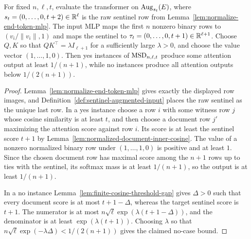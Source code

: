 \begin{lemma}
  \label{lem:msd-normalized-attention-gap}
  For fixed $n,\ell,t$, evaluate the transformer on
  $\operatorname{Aug}_{s_t}(E)$, where $s_t=(0,\ldots,0,t+2)\in\mathbb{R}^\ell$ is the raw sentinel
  row from Lemma~\ref{lem:normalize-end-token-mlp}.  The input MLP maps the
  first $n$ nonzero binary rows to $(v_i/\|v_i\|,1)$ and maps the sentinel to
  $\tau_t=(0,\ldots,0,t+1)\in\mathbb{R}^{\ell+1}$.  Choose $Q,K$ so that
  $QK^\top=\lambda I_{\ell+1}$ for a sufficiently large $\lambda>0$, and choose
  the value vector $(1,\ldots,1,0)$.  Then yes instances of
  $\mathrm{MSD}_{n,\ell,t}$ produce some attention output at least $1/(n+1)$, while no
  instances produce all attention outputs below $1/(2(n+1))$.
\end{lemma}
\begin{proof}
  Lemma~\ref{lem:normalize-end-token-mlp} gives exactly the displayed row
  images, and Definition~\ref{def:sentinel-augmented-input} places the raw
  sentinel as the unique last row.  In a yes instance choose a row $i$ with
  some witness row $j$ whose cosine similarity is at least $t$, and then choose
  a document row $j'$ maximizing the attention score against row $i$.  Its
  score is at least the sentinel score $t+1$ by
  Lemma~\ref{lem:normalized-document-inner-cosine}.  The value of a nonzero
  normalized binary row under $(1,\ldots,1,0)$ is positive and at least $1$.
  Since the chosen document row has maximal score among the $n+1$ rows up to
  ties with the sentinel, its softmax mass is at least $1/(n+1)$, so the output
  is at least $1/(n+1)$.

  In a no instance Lemma~\ref{lem:finite-cosine-threshold-gap} gives
  $\Delta>0$ such that every document score is at most $t+1-\Delta$, whereas
  the target sentinel score is $t+1$.  The numerator is at most
  $n\sqrt{\ell}\exp(\lambda(t+1-\Delta))$, and the denominator is at least
  $\exp(\lambda(t+1))$.  Choosing $\lambda$ so that
  $n\sqrt{\ell}\exp(-\lambda\Delta)<1/(2(n+1))$ gives the claimed no-case
  bound.
\end{proof}

